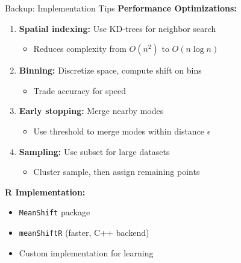 \begin{frame}{Backup: Implementation Tips}
    \textbf{Performance Optimizations:}
    \begin{enumerate}
        \item \textbf{Spatial indexing:} Use KD-trees for neighbor search
        \begin{itemize}
            \item Reduces complexity from $O(n^2)$ to $O(n \log n)$
        \end{itemize}

        \item \textbf{Binning:} Discretize space, compute shift on bins
        \begin{itemize}
            \item Trade accuracy for speed
        \end{itemize}

        \item \textbf{Early stopping:} Merge nearby modes
        \begin{itemize}
            \item Use threshold to merge modes within distance $\epsilon$
        \end{itemize}

        \item \textbf{Sampling:} Use subset for large datasets
        \begin{itemize}
            \item Cluster sample, then assign remaining points
        \end{itemize}
    \end{enumerate}

    \vspace{0.5cm}

    \textbf{R Implementation:}
    \begin{itemize}
        \item \texttt{MeanShift} package
        \item \texttt{meanShiftR} (faster, C++ backend)
        \item Custom implementation for learning
    \end{itemize}
\end{frame}


